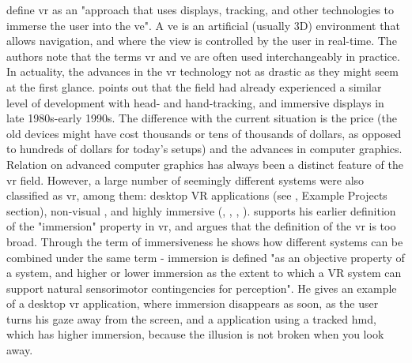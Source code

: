 \cite{jr_3d_2017} define \gls{vr} as an "approach that uses displays, tracking, and other technologies to immerse the user into the \gls{ve}". A \gls{ve} is an artificial (usually 3D) environment that allows navigation, and where the view is controlled by the user in real-time. The authors note that the terms \gls{vr} and \gls{ve} are often used interchangeably in practice. 
In actuality, the advances in the \gls{vr} technology not as drastic as they might seem at the first glance. \cite{slater_immersion_2018} points out that the field had already experienced a similar level of development with head- and hand-tracking, and immersive displays in late 1980s-early 1990s. The difference with the current situation is the price (the old devices might have cost thousands or tens of thousands of dollars, as opposed to hundreds of dollars for today's setups) and the advances in computer graphics.
Relation on advanced computer graphics has always been a distinct feature of the \gls{vr} field. However, a large number of seemingly different systems were also classified as \gls{vr}, among them: desktop VR applications (see \cite{churchill_collaborative_1998}, Example Projects section), non-visual \cite{ammi_intermodal_2015}, and highly immersive (\cite{davidson_greenspace_1996}, \cite{greenwald_cocoverse_nodate}, \cite{lena_real-time_nodate}, \cite{kulik_virtual_2018}). \cite{slater_immersion_2018} supports his earlier definition of the "immersion" property in \gls{vr}, and argues that the definition of the \gls{vr} is too broad. Through the term of immersiveness he shows how different systems can be combined under the same term - immersion is defined "as an objective property of a system, and higher or lower immersion as the extent to which a VR system can support natural sensorimotor contingencies for perception". He gives an example of a desktop \gls{vr} application, where immersion disappears as soon, as the user turns his gaze away from the screen, and a application using a tracked \gls{hmd}, which has higher immersion, because the illusion is not broken when you look away.






